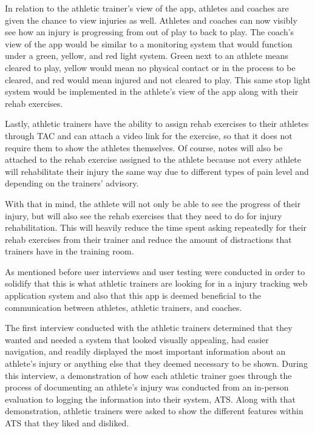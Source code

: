\documentclass[10pt,twocolumn]{article}
\begin{document}
In relation to the athletic trainer's view of the app, athletes and coaches are given the chance to view injuries as well. Athletes and coaches can now visibly see how an injury is progressing from out of play to back to play. The coach's view of the app would be similar to a monitoring system that would function under a green, yellow, and red light system. Green next to an athlete means cleared to play, yellow would mean no physical contact or in the process to be cleared, and red would mean injured and not cleared to play. This same stop light system would be implemented in the athlete's view of the app along with their rehab exercises.

Lastly, athletic trainers have the ability to assign rehab exercises to their athletes through TAC and can attach a video link for the exercise, so that it does not require them to show the athletes themselves. Of course, notes will also be attached to the rehab exercise assigned to the athlete because not every athlete will rehabilitate their injury the same way due to different types of pain level and depending on the trainers' advisory.

With that in mind, the athlete will not only be able to see the progress of their injury, but will also see the rehab exercises that they need to do for injury rehabilitation. This will heavily reduce the time spent asking repeatedly for their rehab exercises from their trainer and reduce the amount of distractions that trainers have in the training room.

As mentioned before user interviews and user testing were conducted in order to solidify that this is what athletic trainers are looking for in a injury tracking web application system and also that this app is deemed beneficial to the communication between athletes, athletic trainers, and  coaches.

The first interview conducted with the athletic trainers determined that they wanted and needed a system that looked visually appealing, had easier navigation, and readily displayed the most important information about an athlete's injury or anything else that they deemed necessary to be shown. During this interview, a demonstration of how each athletic trainer goes through the process of documenting an athlete's injury was conducted from an in-person evaluation to logging the information into their system, ATS. Along with that demonstration, athletic trainers were asked to show the different features within ATS that they liked and disliked.
\end{document}
